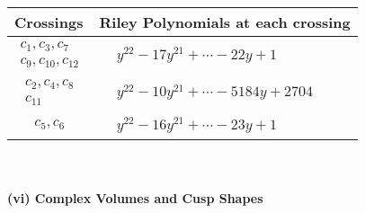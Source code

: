 \documentclass[1p]{elsarticle_modified}
\theoremstyle{definition}
\begin{document}
\begin{tabular}{m{50pt}|m{274pt}}
Crossings & \hspace{64pt}Riley Polynomials at each crossing \\
\hline $$\begin{aligned}c_{1},c_{3},c_{7}\\c_{9},c_{10},c_{12}\end{aligned}$$&$\begin{aligned}
&y^{22}-17 y^{21}+\cdots-22 y+1
\end{aligned}$\\
\hline $$\begin{aligned}c_{2},c_{4},c_{8}\\c_{11}\end{aligned}$$&$\begin{aligned}
&y^{22}-10 y^{21}+\cdots-5184 y+2704
\end{aligned}$\\
\hline $$\begin{aligned}c_{5},c_{6}\end{aligned}$$&$\begin{aligned}
&y^{22}-16 y^{21}+\cdots-23 y+1
\end{aligned}$\\
\hline
\end{tabular}\\~\\
\newpage\flushleft \textbf{(vi) Complex Volumes and Cusp Shapes}
\end{document}
